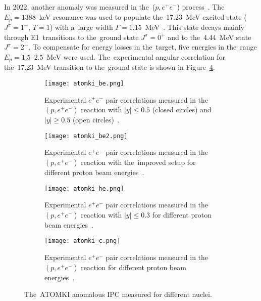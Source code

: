 			In 2022, another anomaly was measured in the~($p,e^+e^-$) process~\cite{atomki_c}. The~$E_p = 1388$~keV resonance was used to populate the~17.23~MeV excited state ($J^\pi = 1^-$, $T = 1$) with a~large width $\Gamma = 1.15$~MeV~\cite{resonances3}. This state decays mainly through E1~transitions to the~ground state $J^\pi = 0^+$ and to the~4.44~MeV state $J^\pi = 2^+$. To compensate for energy losses in the~target, five energies in the~range $E_p = 1.5\text{--}2.5$~MeV were used. The~experimental angular correlation for the~17.23~MeV transition to the~ground state is shown in Figure~\ref{fig:atomki_c}.
			
				\begin{figure}
					\centering
					\begin{subfigure}[t]{0.48\textwidth}
						\centering
						\texttt{[image: atomki\_be.png]}
						\caption{Experimental $e^+e^-$ pair correlations measured in the~$(p,e^+e^-)$ reaction with $|y| \leq 0.5$ (closed circles) and $|y| \geq 0.5$ (open circles)~\cite{atomki_be}.}
						\label{fig:atomki_be}
					\end{subfigure}
					\hfill
					\begin{subfigure}[t]{0.42\textwidth}
						\centering
						\texttt{[image: atomki\_be2.png]}
						\caption{Experimental $e^+e^-$ pair correlations measured in the~$(p,e^+e^-)$ reaction with the~improved setup for different proton beam energies~\cite{atomki_be2}.}
						\label{fig:atomki_be2}
					\end{subfigure}
					\begin{subfigure}[t]{0.45\textwidth}
						\centering
						\texttt{[image: atomki\_he.png]}
						\caption{Experimental $e^+e^-$ pair correlations measured in the~$(p,e^+e^-)$ reaction with $|y| \leq 0.3$ for different proton beam energies~\cite{atomki_he2}.}
						\label{fig:atomki_he}
					\end{subfigure}
					\hfill
					\begin{subfigure}[t]{0.45\textwidth}
						\centering
						\texttt{[image: atomki\_c.png]}
						\caption{Experimental $e^+e^-$ pair correlations measured in the~$(p,e^+e^-)$ reaction for different proton beam energies~\cite{atomki_c}.}
						\label{fig:atomki_c}
					\end{subfigure}
					\caption{The~ATOMKI anomalous \ac{IPC} measured for different nuclei.}
					\label{fig:atomki}
				\end{figure}
			

